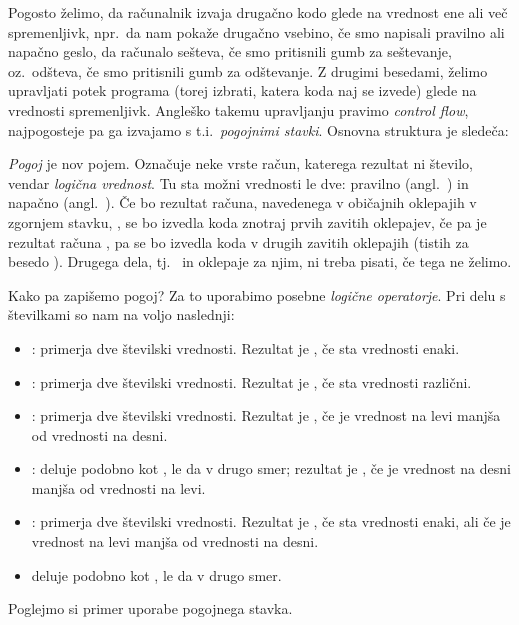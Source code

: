 Pogosto želimo, da računalnik izvaja drugačno kodo glede na vrednost ene ali
več spremenljivk, npr.~da nam pokaže drugačno vsebino, če smo napisali
pravilno ali napačno geslo, da računalo sešteva, če smo pritisnili gumb za
seštevanje, oz.~odšteva, če smo pritisnili gumb za odštevanje.
Z drugimi besedami, želimo upravljati potek programa (torej izbrati, katera koda
naj se izvede) glede na vrednosti spremenljivk.
Angleško takemu upravljanju pravimo \emph{control flow}, najpogosteje pa ga
izvajamo s t.i.~\emph{pogojnimi stavki}.
Osnovna struktura je sledeča:


\emph{Pogoj} je nov pojem. Označuje neke vrste račun, katerega rezultat ni
število, vendar \emph{logična vrednost}.
Tu sta možni vrednosti le dve: pravilno (angl.~) in napačno
(angl.~).
Če bo rezultat računa, navedenega v običajnih oklepajih v zgornjem 
stavku, , se bo izvedla koda znotraj prvih zavitih oklepajev, če pa
je rezultat računa , pa se bo izvedla koda v drugih zavitih
oklepajih (tistih za besedo ).
Drugega dela, tj.~ in oklepaje za njim, ni treba pisati, če tega ne
želimo.

Kako pa zapišemo pogoj?
Za to uporabimo posebne \emph{logične operatorje}.
Pri delu s številkami so nam na voljo naslednji:
\begin{itemize}
\item \koda{==}: primerja dve številski vrednosti.
  Rezultat je , če sta vrednosti enaki.
\item \koda{!=}: primerja dve številski vrednosti.
  Rezultat je , če sta vrednosti različni.
\item \koda{<}: primerja dve številski vrednosti.
  Rezultat je , če je vrednost na levi manjša od vrednosti na desni.
\item \koda{>}: deluje podobno kot \koda{<}, le da v drugo smer;
  rezultat je , če je vrednost na desni manjša od vrednosti na levi.
\item \koda{<=}: primerja dve številski vrednosti.
  Rezultat je , če sta vrednosti enaki, ali če je vrednost
  na levi manjša od vrednosti na desni.
\item \koda{>=} deluje podobno kot \koda{<=}, le da v drugo smer.
\end{itemize}

Poglejmo si primer uporabe pogojnega stavka.

